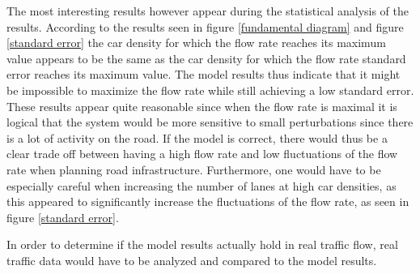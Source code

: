 \documentclass[a4paper,12pt]{article}
\begin{document}
The most interesting results however appear during the statistical analysis of the results.
According to the results seen in figure \ref*{fundamental diagram} and figure \ref*{standard error} the car density for which the flow rate reaches its maximum value appears
to be the same as the car density for which the flow rate standard error reaches its maximum value. The model results thus indicate that it might be impossible to maximize the flow rate while still
achieving a low standard error. These results appear quite reasonable since when the flow rate is maximal it is logical that the system would be more sensitive
to small perturbations since there is a lot of activity on the road. If the model is correct, there would thus be a clear trade off between having a high flow rate and
low fluctuations of the flow rate when planning road infrastructure.
Furthermore, one would have to be especially careful when increasing the number of lanes at high car densities, 
as this appeared to significantly increase the fluctuations of the flow rate, as seen in figure \ref*{standard error}.

In order to determine if the model results actually hold in real traffic flow, real traffic data would have to be analyzed and compared to the model results.
\end{document}

